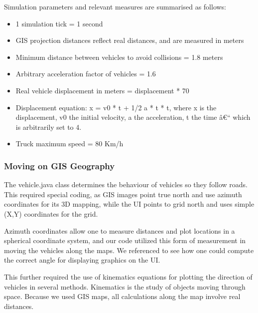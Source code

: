 \documentclass[11pt]{article}
\begin{document}
Simulation parameters and relevant measures are summarised as follows:
\begin{itemize}
\item 1 simulation tick = 1 second
\item GIS projection distances reflect real distances, and are measured in meters
\item Minimum distance between vehicles to avoid collisions = 1.8 meters
\item Arbitrary acceleration factor of vehicles = 1.6
\item Real vehicle displacement in meters = displacement * 70
\item Displacement equation: x = v0 * t + 1/2 a * t * t, where x is the displacement, v0 the initial velocity, a the acceleration, t the time â€“ which is arbitrarily set to 4.
\item Truck maximum speed = 80 Km/h
\end{itemize}


\subsubsection{Moving on GIS Geography}

The vehicle.java class determines the behaviour of vehicles so they follow roads. This required special coding, as GIS images point true north and use azimuth coordinates for its 3D mapping, while the UI points to grid north and uses simple (X,Y) coordinates for the grid. 

Azimuth coordinates allow one to measure distances and plot locations in a spherical coordinate system, and our code utilized this form of measurement in moving the vehicles along the maps. We referenced \cite{9i} to see how one could compute the correct angle for displaying graphics on the UI. 

This further required the use of kinematics equations for plotting the direction of vehicles in several methods. Kinematics is the study of objects moving through space. Because we used GIS maps, all calculations along the map involve real distances.
\\
\end{document}
